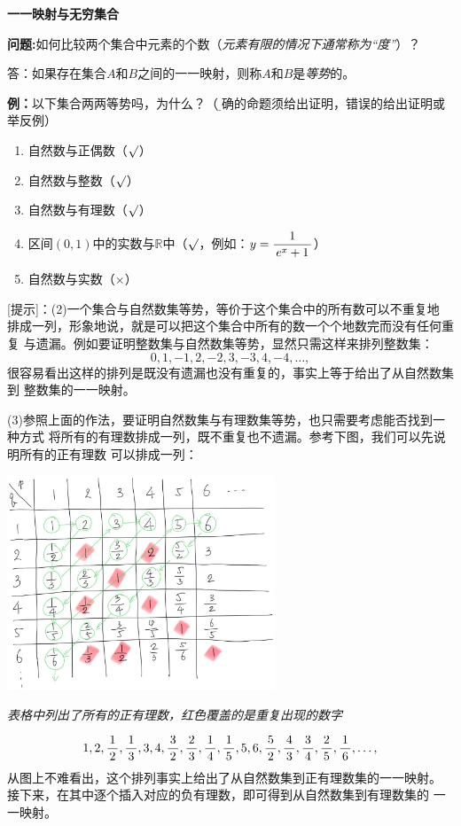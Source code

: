 \begin{shaded}
	{\bf 一一映射与无穷集合}
	
	{\bf 问题:}如何比较两个集合中元素的个数（{\it 元素有限的情况下通常称为“度”}）？
	
	答：如果存在集合$A$和$B$之间的一一映射，则称$A$和$B$是{\it 等势}的。
	
	{\bf 例：}以下集合两两等势吗，为什么？（{\b 正确的命题须给出证明，错误的给出证明或举反例}）
	\begin{enumerate}[(1)]
	  \setlength{\itemindent}{1cm}
	  \item 自然数与正偶数（{$\surd$}）
	  \item 自然数与整数（{$\surd$}）
	  \item 自然数与有理数（{$\surd$}）
	  \item 区间$(0,1)$中的实数与$\mathbb{R}$中（{$\surd$}，例如：$y=\displaystyle\frac{\,{1}\,}{\,{e^x+1}\,}$）
	  \item 自然数与实数（{$\times$}）
	\end{enumerate}
	
	[提示]：(2)\;一个集合与自然数集等势，等价于这个集合中的所有数可以不重复地
	排成一列，形象地说，就是可以把这个集合中所有的数一个个地数完而没有任何重复
	与遗漏。例如要证明整数集与自然数集等势，显然只需这样来排列整数集：
	$$0,1,-1,2,-2,3,-3,4,-4,\ldots,$$
	很容易看出这样的排列是既没有遗漏也没有重复的，事实上等于给出了从自然数集到
	整数集的一一映射。
	
	(3)\;参照上面的作法，要证明自然数集与有理数集等势，也只需要考虑能否找到一种方式
	将所有的有理数排成一列，既不重复也不遗漏。参考下图，我们可以先说明所有的正有理数
	可以排成一列：
	\begin{center}
		\includegraphics[width=8cm]{./images/ch1/Qp.jpg}
		
		{\it 表格中列出了所有的正有理数，红色覆盖的是重复出现的数字}
	\end{center}
	$$1,2,\displaystyle\frac{\,{1}\,}{\,{2}\,},\displaystyle\frac{\,{1}\,}{\,{3}\,},3,4,\displaystyle\frac{\,{3}\,}{\,{2}\,},\displaystyle\frac{\,{2}\,}{\,{3}\,},\displaystyle\frac{\,{1}\,}{\,{4}\,},\displaystyle\frac{\,{1}\,}{\,{5}\,},5,6,\displaystyle\frac{\,{5}\,}{\,{2}\,},
	\displaystyle\frac{\,{4}\,}{\,{3}\,},\displaystyle\frac{\,{3}\,}{\,{4}\,},\displaystyle\frac{\,{2}\,}{\,{5}\,},\displaystyle\frac{\,{1}\,}{\,{6}\,},\ldots,$$
	从图上不难看出，这个排列事实上给出了从自然数集到正有理数集的一一映射。
	接下来，在其中逐个插入对应的负有理数，即可得到从自然数集到有理数集的
	一一映射。
	

\end{shaded}
